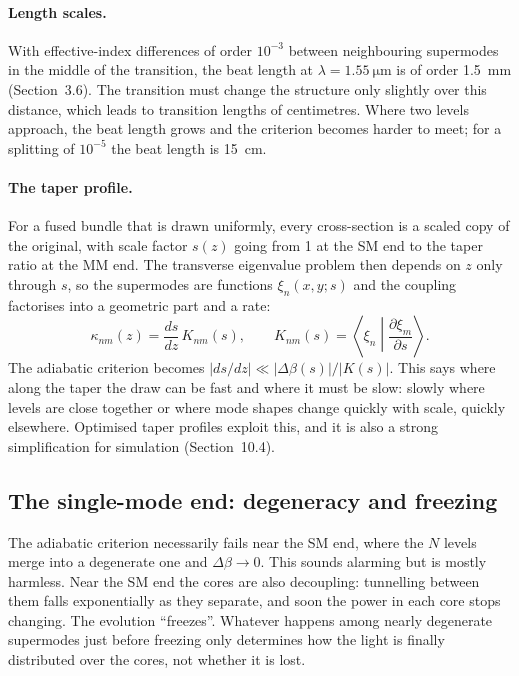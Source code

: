 \documentclass[11pt,a4paper]{article}
\begin{document}
\paragraph{Length scales.} With effective-index differences of order $10^{-3}$ between neighbouring supermodes in the middle of the transition, the beat length at $\lambda = \SI{1.55}{\micro\meter}$ is of order \SI{1.5}{\milli\meter} (Section~3.6). The transition must change the structure only slightly over this distance, which leads to transition lengths of centimetres. Where two levels approach, the beat length grows and the criterion becomes harder to meet; for a splitting of $10^{-5}$ the beat length is \SI{15}{\centi\meter}.

\paragraph{The taper profile.} For a fused bundle that is drawn uniformly, every cross-section is a scaled copy of the original, with scale factor $s(z)$ going from 1 at the SM end to the taper ratio at the MM end. The transverse eigenvalue problem then depends on $z$ only through $s$, so the supermodes are functions $\xi_n(x,y;s)$ and the coupling factorises into a geometric part and a rate:
\begin{equation}
\kappa_{nm}(z) = \frac{ds}{dz}\, K_{nm}(s),
\qquad
K_{nm}(s) = \left\langle \xi_n \middle| \frac{\partial \xi_m}{\partial s} \right\rangle.
\label{eq:kappa_scaled}
\end{equation}
The adiabatic criterion becomes $|ds/dz| \ll |\Delta\beta(s)|/|K(s)|$. This says where along the taper the draw can be fast and where it must be slow: slowly where levels are close together or where mode shapes change quickly with scale, quickly elsewhere. Optimised taper profiles exploit this, and it is also a strong simplification for simulation (Section~10.4).

\subsection{The single-mode end: degeneracy and freezing}
The adiabatic criterion necessarily fails near the SM end, where the $N$ levels merge into a degenerate one and $\Delta\beta \to 0$. This sounds alarming but is mostly harmless. Near the SM end the cores are also decoupling: tunnelling between them falls exponentially as they separate, and soon the power in each core stops changing. The evolution ``freezes''. Whatever happens among nearly degenerate supermodes just before freezing only determines how the light is finally distributed over the cores, not whether it is lost.
\end{document}
